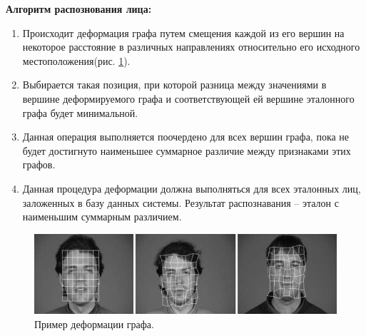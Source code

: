 \textbf{Алгоритм распознования лица:}
\begin{enumerate}
    \item Происходит деформация графа путем смещения каждой из его вершин на некоторое расстояние
    в различных направлениях относительно его исходного местоположения(рис. \ref{img:demonstration}).
    \item Выбирается такая позиция, при которой разница между значениями в вершине деформируемого графа и 
    соответствующей ей вершине эталонного графа будет минимальной.
    \item Данная операция выполняется поочердено для всех вершин графа, пока не будет достигнуто наименьшее суммарное различие 
    между признаками этих графов.
    \item  Данная процедура деформации должна выполняться для всех эталонных лиц, заложенных в базу данных системы. 
    Результат распознавания -- эталон с наименьшим суммарным различием.
\end{enumerate}


\begin{figure}[h]
    \centering
    \includegraphics[height=0.15\textheight]{img/img_a.jpg}
    \caption{Пример деформации графа.}
    \label{img:demonstration}
\end{figure}
    
